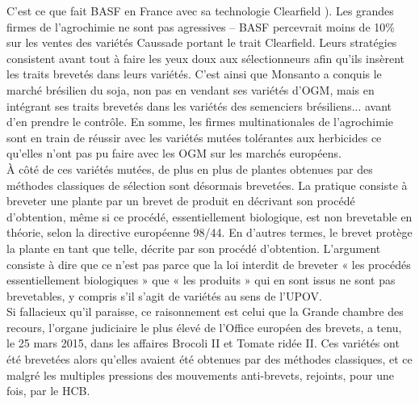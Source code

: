 \documentclass[8pt]{article}
\begin{document}
C’est ce que fait BASF en France avec sa
technologie Clearfield ). Les grandes firmes de l’agrochimie ne
sont pas agressives – BASF percevrait moins de 10\% sur les ventes des variétés Caussade
portant le trait Clearfield. Leurs stratégies consistent avant tout à faire les yeux doux
aux sélectionneurs afin qu’ils insèrent les
traits brevetés dans leurs variétés. C’est
ainsi que Monsanto a conquis le marché
brésilien du soja, non pas en vendant ses
variétés d’OGM, mais en intégrant ses traits
brevetés dans les variétés des semenciers
brésiliens... avant d’en prendre le contrôle.
En somme, les firmes multinationales de
l’agrochimie sont en train de réussir avec les
variétés mutées tolérantes aux herbicides
ce qu’elles n’ont pas pu faire avec les OGM
sur les marchés européens.\\

À côté de ces variétés mutées, de plus en
plus de plantes obtenues par des méthodes
classiques de sélection sont désormais brevetées. La pratique consiste à breveter une
plante par un brevet de produit en décrivant
son procédé d’obtention, même si ce procédé,
essentiellement biologique, est non brevetable
en théorie, selon la directive européenne 98/44.
En d’autres termes, le brevet protège la plante
en tant que telle, décrite par son procédé d’obtention. L’argument consiste à dire que ce n’est
pas parce que la loi interdit de breveter « les
procédés essentiellement biologiques » que
« les produits » qui en sont issus ne sont pas
brevetables, y compris s’il s’agit de variétés
au sens de l’UPOV.\\

Si fallacieux qu’il paraisse, ce raisonnement
est celui que la Grande chambre des recours,
l’organe judiciaire le plus élevé de l’Office européen des brevets, a tenu, le 25 mars 2015,
dans les affaires Brocoli II et Tomate ridée II.
Ces variétés ont été brevetées alors qu’elles
avaient été obtenues par des méthodes classiques, et ce malgré les multiples pressions
des mouvements anti-brevets, rejoints, pour
une fois, par le HCB.\\
\end{document}
